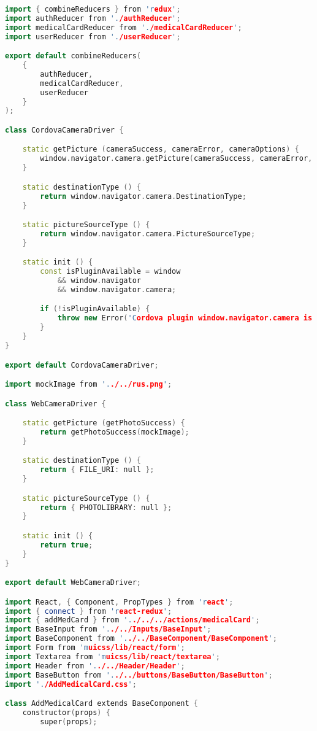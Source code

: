 \begin{lstlisting}[language=C++, style=cplusplusstyle]
import { combineReducers } from 'redux';
import authReducer from './authReducer';
import medicalCardReducer from './medicalCardReducer';
import userReducer from './userReducer';

export default combineReducers(
    {
        authReducer,
        medicalCardReducer,
        userReducer
    }
);

class CordovaCameraDriver {

    static getPicture (cameraSuccess, cameraError, cameraOptions) {
        window.navigator.camera.getPicture(cameraSuccess, cameraError, cameraOptions);
    }

    static destinationType () {
        return window.navigator.camera.DestinationType;
    }

    static pictureSourceType () {
        return window.navigator.camera.PictureSourceType;
    }

    static init () {
        const isPluginAvailable = window
            && window.navigator
            && window.navigator.camera;

        if (!isPluginAvailable) {
            throw new Error('Cordova plugin window.navigator.camera is not found');
        }
    }
}

export default CordovaCameraDriver;

import mockImage from '../../rus.png';

class WebCameraDriver {

    static getPicture (getPhotoSuccess) {
        return getPhotoSuccess(mockImage);
    }

    static destinationType () {
        return { FILE_URI: null };
    }

    static pictureSourceType () {
        return { PHOTOLIBRARY: null };
    }

    static init () {
        return true;
    }
}

export default WebCameraDriver;

import React, { Component, PropTypes } from 'react';
import { connect } from 'react-redux';
import { addMedCard } from '../../../actions/medicalCard';
import BaseInput from '../../Inputs/BaseInput';
import BaseComponent from '../../BaseComponent/BaseComponent';
import Form from 'muicss/lib/react/form';
import Textarea from 'muicss/lib/react/textarea';
import Header from '../../Header/Header';
import BaseButton from '../../buttons/BaseButton/BaseButton';
import './AddMedicalCard.css';

class AddMedicalCard extends BaseComponent {
    constructor(props) {
        super(props);


\end{lstlisting}
